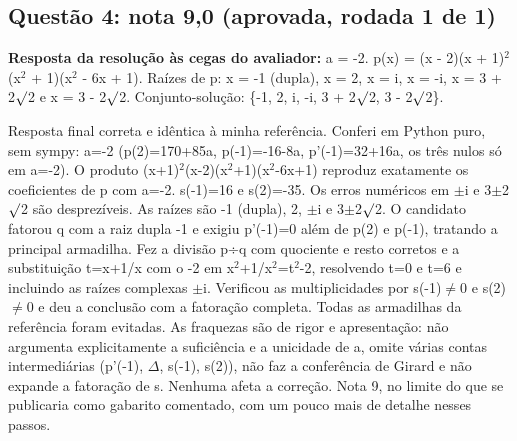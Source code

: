 \documentclass{article}%
\begin{document}
\subsection*{Questão 4: nota 9,0 (aprovada, rodada 1 de 1)}%
\textbf{Resposta da resolução às cegas do avaliador:} a = -2. p(x) = (x - 2)(x + 1)$^2$(x$^2$ + 1)(x$^2$ - 6x + 1). Raízes de p: x = -1 (dupla), x = 2, x = i, x = -i, x = 3 + 2$\surd$2 e x = 3 - 2$\surd$2. Conjunto{-}solução: \{-1, 2, i, -i, 3 + 2$\surd$2, 3 - 2$\surd$2\}.\par %
Resposta final correta e idêntica à minha referência. Conferi em Python puro, sem sympy: a={-}2 (p(2)=170+85a, p({-}1)={-}16{-}8a, p'({-}1)=32+16a, os três nulos só em a={-}2). O produto (x+1)$^2$(x{-}2)(x$^2$+1)(x$^2${-}6x+1) reproduz exatamente os coeficientes de p com a={-}2. s({-}1)=16 e s(2)={-}35. Os erros numéricos em $\pm$i e 3$\pm$2$\surd$2 são desprezíveis. As raízes são {-}1 (dupla), 2, $\pm$i e 3$\pm$2$\surd$2. O candidato fatorou q com a raiz dupla {-}1 e exigiu p'({-}1)=0 além de p(2) e p({-}1), tratando a principal armadilha. Fez a divisão p÷q com quociente e resto corretos e a substituição t=x+1/x com o {-}2 em x$^2$+1/x$^2$=t$^2${-}2, resolvendo t=0 e t=6 e incluindo as raízes complexas $\pm$i. Verificou as multiplicidades por s({-}1)$\neq$0 e s(2)$\neq$0 e deu a conclusão com a fatoração completa. Todas as armadilhas da referência foram evitadas. As fraquezas são de rigor e apresentação: não argumenta explicitamente a suficiência e a unicidade de a, omite várias contas intermediárias (p'({-}1), $\Delta$, s({-}1), s(2)), não faz a conferência de Girard e não expande a fatoração de s. Nenhuma afeta a correção. Nota 9, no limite do que se publicaria como gabarito comentado, com um pouco mais de detalhe nesses passos.%
\end{document}
